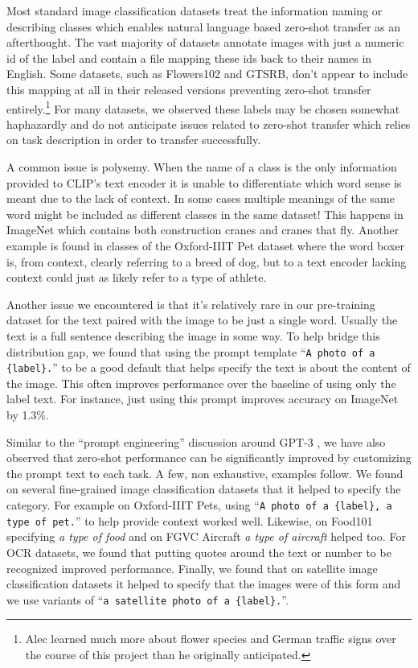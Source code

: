 Most standard image classification datasets treat the information naming or describing classes which enables natural language based zero-shot transfer as an afterthought. The vast majority of datasets annotate images with just a numeric id of the label and contain a file mapping these ids back to their names in English. Some datasets, such as Flowers102 and GTSRB, don't appear to include this mapping at all in their released versions preventing zero-shot transfer entirely.\footnote{Alec learned much more about flower species and German traffic signs over the course of this project than he originally anticipated.} For many datasets, we observed these labels may be chosen somewhat haphazardly and do not anticipate issues related to zero-shot transfer which relies on task description in order to transfer successfully.

A common issue is polysemy. When the name of a class is the only information provided to CLIP's text encoder it is unable to differentiate which word sense is meant due to the lack of context. In some cases multiple meanings of the same word might be included as different classes in the same dataset! This happens in ImageNet which contains both construction cranes and cranes that fly. Another example is found in classes of the Oxford-IIIT Pet dataset where the word boxer is, from context, clearly referring to a breed of dog, but to a text encoder lacking context could just as likely refer to a type of athlete.

Another issue we encountered is that it's relatively rare in our pre-training dataset for the text paired with the image to be just a single word. Usually the text is a full sentence describing the image in some way. To help bridge this distribution gap, we found that using the prompt template ``\texttt{A photo of a \{label\}.}'' to be a good default that helps specify the text is about the content of the image. This often improves performance over the baseline of using only the label text. For instance, just using this prompt improves accuracy on ImageNet by 1.3\%.

Similar to the ``prompt engineering'' discussion around GPT-3 \citep{brown2020language,gao2020making}, we have also observed that zero-shot performance can be significantly improved by customizing the prompt text to each task. A few, non exhaustive, examples follow. We found on several fine-grained image classification datasets that it helped to specify the category. For example on Oxford-IIIT Pets, using ``\texttt{A photo of a \{label\}, a type of pet.}'' to help provide context worked well. Likewise, on Food101 specifying \textit{a type of food} and on FGVC Aircraft \textit{a type of aircraft} helped too. For OCR datasets, we found that putting quotes around the text or number to be recognized improved performance. Finally, we found that on satellite image classification datasets it helped to specify that the images were of this form and we use variants of ``\texttt{a satellite photo of a \{label\}.}''.

